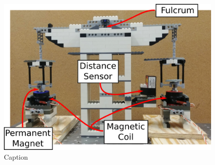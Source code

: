 \documentclass[aps,prstab,reprint,12pt]{revtex4-1}
\begin{document}

\begin{figure}
    \centering
    \includegraphics[width=0.95\linewidth]{figs/watt_balance2.jpg.png}
    \caption{Caption}
    \label{fig:our_balance}
\end{figure}




\end{document}
